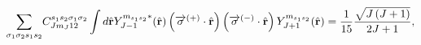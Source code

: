 \begin{equation}
\underset{\sigma _{1}\sigma _{2}s_{1}s_{2}}{\sum }C_{Jm_{J}12}^{s_{1}s_{2}%
\sigma _{1}\sigma _{2}}\int d\hat{\mathbf{r}}Y_{J-1}^{m_{s_{1}s_{2}}\ast
}(\hat{\mathbf{r}})\left( \overrightarrow{\mathbf{\sigma }}^{\left(
+\right) }\cdot \hat{\mathbf{r}}\right) \left( \overrightarrow{\mathbf{%
\sigma }}^{\left( -\right) }\cdot \hat{\mathbf{r}}\right)
Y_{J+1}^{m_{s_{1}s_{2}}}(\hat{\mathbf{r}})=\frac{1}{15}\frac{\sqrt{%
J\left( J+1\right) }}{2J+1},
\end{equation}

